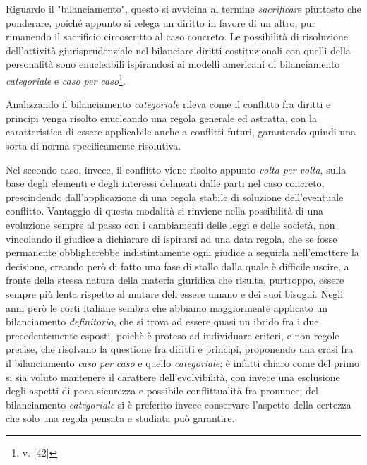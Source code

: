 Riguardo il "bilanciamento", questo si avvicina al termine \textit{sacrificare} piuttosto che ponderare, poiché appunto si relega un diritto in favore di un altro, pur rimanendo  il sacrificio circoscritto al caso concreto.
Le possibilità di risoluzione dell'attività giurisprudenziale nel bilanciare diritti costituzionali con quelli della personalità sono enucleabili ispirandosi ai modelli americani di bilanciamento \textit{categoriale} e \textit{caso per caso}\footnote{v. [42]}.

Analizzando il bilanciamento \textit{categoriale} rileva come il conflitto fra diritti e principi venga risolto enucleando una regola generale ed astratta, con la caratteristica di essere applicabile anche a conflitti futuri, garantendo quindi una sorta di norma specificamente risolutiva.

Nel secondo caso, invece, il conflitto viene risolto appunto \textit{volta per volta}, sulla base degli elementi e degli interessi delineati dalle parti nel caso concreto, prescindendo dall’applicazione di una regola stabile di soluzione dell'eventuale conflitto. Vantaggio di questa modalità si rinviene nella possibilità di una evoluzione sempre al passo con i cambiamenti delle leggi e delle società, non vincolando il giudice a dichiarare di ispirarsi ad una data regola, che se fosse permanente obbligherebbe indistintamente ogni giudice a seguirla nell'emettere la decisione, creando però di fatto una fase di stallo dalla quale è difficile uscire, a fronte della stessa natura della materia giuridica che risulta, purtroppo, essere sempre più lenta rispetto al mutare dell'essere umano e dei suoi bisogni. 
Negli anni però le corti italiane sembra che abbiamo maggiormente applicato un bilanciamento \textit{definitorio}, che si trova ad essere quasi un ibrido fra i due precedentemente esposti, poichè è proteso ad individuare criteri, e non regole precise, che risolvano la questione fra diritti e principi, proponendo una crasi fra il bilanciamento \textit{caso per caso} e quello \textit{categoriale}; è infatti chiaro come del primo si sia voluto mantenere il carattere dell'evolvibilità, con invece una esclusione degli aspetti di poca sicurezza e possibile conflittualità fra pronunce; del bilanciamento \textit{categoriale} si è preferito invece conservare l'aspetto della certezza che solo una regola pensata e studiata può garantire.

